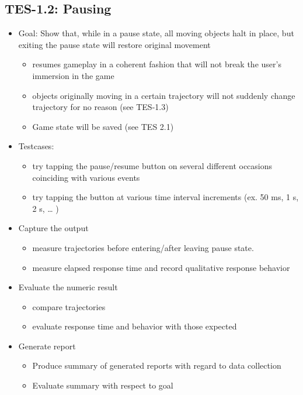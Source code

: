 \subsection{TES-1.2: Pausing }
\begin{itemize}
\item Goal: Show that, while in a pause state, all moving objects halt in
place, but exiting the pause state will restore original movement 

\begin{itemize}
\item resumes gameplay in a coherent fashion that will not break the user\textquoteright{}s
immersion in the game 
\item objects originally moving in a certain trajectory will not suddenly
change trajectory for no reason (see TES-1.3) 
\item Game state will be saved (see TES 2.1) 
\end{itemize}
\item Testcases: 

\begin{itemize}
\item try tapping the pause/resume button on several different occasions
coinciding with various events 
\item try tapping the button at various time interval increments (ex. 50
ms, 1 s, 2 s, \ldots{} ) 
\end{itemize}
\item Capture the output 

\begin{itemize}
\item measure trajectories before entering/after leaving pause state. 
\item measure elapsed response time and record qualitative response behavior 
\end{itemize}
\item Evaluate the numeric result 

\begin{itemize}
\item compare trajectories 
\item evaluate response time and behavior with those expected 
\end{itemize}
\item Generate report 

\begin{itemize}
\item Produce summary of generated reports with regard to data collection 
\item Evaluate summary with respect to goal
\end{itemize}
\end{itemize}

